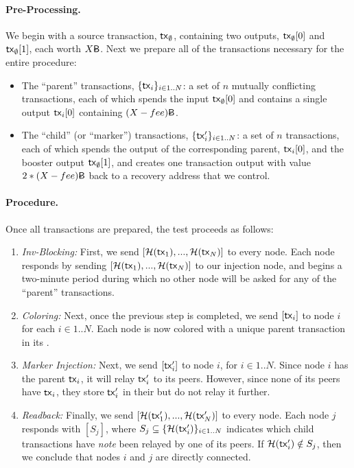 \paragraph{Pre-Processing.}
We begin with a source transaction, $\textnormal{\textsf{tx}}_\emptyset$, containing two outputs, $\textnormal{\textsf{tx}}_\emptyset[0]$ and $\textnormal{\textsf{tx}}_\emptyset[1]$, each worth $X\btc$. 
Next we prepare all of the transactions necessary for the entire procedure:
\begin{itemize}
\item The ``parent'' transactions, $\{\textnormal{\textsf{tx}}_i\}_{i \in 1..N}$: a set of $n$ mutually conflicting transactions, each of which spends the input $\textnormal{\textsf{tx}}_\emptyset[0]$ and contains a single output $\textnormal{\textsf{tx}}_i[0]$ containing $(X-fee)\btc$.
\item The ``child'' (or ``marker'') transactions, $\{\textnormal{\textsf{tx}}'_i\}_{i \in 1..N}$: a set of $n$ transactions, each of which spends the output of the corresponding parent, $\textnormal{\textsf{tx}}_i[0]$, and the booster output $\textnormal{\textsf{tx}}_\emptyset[1]$, and creates one transaction output with value $2*(X-fee)\btc$ back to a recovery address that we control.
\end{itemize}

\paragraph{Procedure.} Once all transactions are prepared, the test proceeds as follows:
\begin{enumerate}
\item \emph{Inv-Blocking:} First, we send $[\mathcal{H}(\textnormal{\textsf{tx}}_1),...,\mathcal{H}(\textnormal{\textsf{tx}}_N)]$ to every node. Each node responds by sending $[\mathcal{H}(\textnormal{\textsf{tx}}_1),...,\mathcal{H}(\textnormal{\textsf{tx}}_N)]$ to our injection node, and begins a two-minute period during which no other node will be asked for any of the ``parent'' transactions.
\item \emph{Coloring:} Next, once the previous step is completed, we send $[\textnormal{\textsf{tx}}_i]$ to node $i$ for each $i \in 1..N$. Each node is now colored with a unique parent transaction in its .
\item \emph{Marker Injection:} Next, we send $[\textnormal{\textsf{tx}}'_i]$ to node $i$, for $i \in 1..N$. Since node $i$ has the parent $\textnormal{\textsf{tx}}_i$, it will relay $\textnormal{\textsf{tx}}'_i$ to its peers. However, since none of its peers have $\textnormal{\textsf{tx}}_i$, they store $\textnormal{\textsf{tx}}'_i$ in their  but do not relay it further.
\item \emph{Readback:} Finally, we send $[\mathcal{H}(\textnormal{\textsf{tx}}'_1),...,\mathcal{H}(\textnormal{\textsf{tx}}'_N)]$ to every node. Each node $j$ responds with $[S_j]$, where $S_j \subseteq \{\mathcal{H}(\textnormal{\textsf{tx}}'_i)\}_{i\in 1..N}$ indicates which child transactions have \emph{note} been relayed by one of its peers. If $\mathcal{H}(\textnormal{\textsf{tx}}'_i) \notin S_j$, then we conclude that nodes $i$ and $j$ are directly connected.
\end{enumerate}

